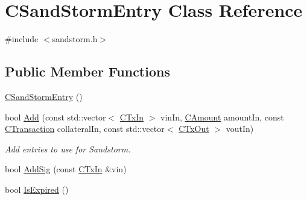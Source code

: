 \hypertarget{class_c_sand_storm_entry}{}\section{C\+Sand\+Storm\+Entry Class Reference}
\label{class_c_sand_storm_entry}


{\ttfamily \#include $<$sandstorm.\+h$>$}

\subsection*{Public Member Functions}
\begin{DoxyCompactItemize}
\item 
\hyperlink{class_c_sand_storm_entry_a15adaf4f0f93427dcadce05e2f7e3174}{C\+Sand\+Storm\+Entry} ()
\item 
bool \hyperlink{class_c_sand_storm_entry_aa1497e8d6693f47968af94ea946ea9e6}{Add} (const std\+::vector$<$ \hyperlink{class_c_tx_in}{C\+Tx\+In} $>$ vin\+In, \hyperlink{amount_8h_a4eaf3a5239714d8c45b851527f7cb564}{C\+Amount} amount\+In, const \hyperlink{class_c_transaction}{C\+Transaction} collateral\+In, const std\+::vector$<$ \hyperlink{class_c_tx_out}{C\+Tx\+Out} $>$ vout\+In)
\begin{DoxyCompactList}\small\item\em Add entries to use for Sandstorm. \end{DoxyCompactList}\item 
bool \hyperlink{class_c_sand_storm_entry_afa10b9e19a0a0916b9d3153e2adce11b}{Add\+Sig} (const \hyperlink{class_c_tx_in}{C\+Tx\+In} \&vin)
\item 
bool \hyperlink{class_c_sand_storm_entry_a903de6ae89a6755fa2e9112e52c6d161}{Is\+Expired} ()
\end{DoxyCompactItemize}
